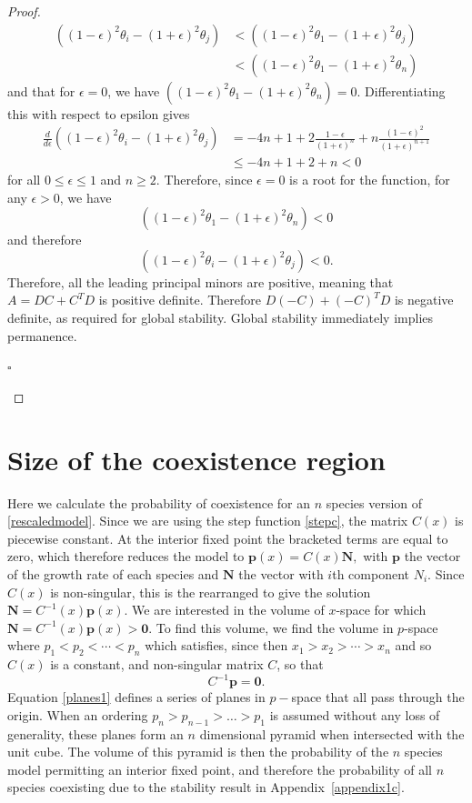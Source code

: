 \begin{proof}
\begin{align*}
\left( (1-\epsilon)^2\theta_i-(1+\epsilon)^2\theta_j\right)&<\left( (1-\epsilon)^2\theta_1-(1+\epsilon)^2\theta_j\right)\\
&<\left( (1-\epsilon)^2\theta_1-(1+\epsilon)^2\theta_n\right)
\end{align*}
and that for $\epsilon=0$, we have $\left( (1-\epsilon)^2\theta_1-(1+\epsilon)^2\theta_n\right)=0$. Differentiating this with respect to epsilon gives
\begin{align*}
\frac{d}{d\epsilon}\left( (1-\epsilon)^2\theta_i-(1+\epsilon)^2\theta_j\right)&=-4n+1+2\frac{1-\epsilon}{(1+\epsilon)^n}+n\frac{(1-\epsilon)^2}{(1+\epsilon)^{n+1}}\\
&\leq-4n +1+2+n < 0
\end{align*}
for all $0\leq \epsilon \leq 1$ and $n\geq2$. Therefore, since $\epsilon=0$ is a root for the function, for any $\epsilon>0$, we have
$$\left( (1-\epsilon)^2\theta_1-(1+\epsilon)^2\theta_n\right)<0$$
and therefore
$$\left( (1-\epsilon)^2\theta_i-(1+\epsilon)^2\theta_j\right)<0.$$
Therefore, all the leading principal minors are positive, meaning that $A=DC+C^TD$ is positive definite. Therefore $D(-C)+(-C)^TD$ is negative definite, as required for global stability. Global stability immediately implies permanence. \begin{flushright} $\square$ \end{flushright}
 \end{proof}
 
 \section{Size of the coexistence region}
 \label{appendix1d}
Here we calculate the probability of coexistence for an $n$ species version of \eqref{rescaledmodel}. Since we are using the step function \eqref{stepc}, the matrix $C(x)$ is piecewise constant. At the interior fixed point the bracketed terms are equal to zero, which therefore reduces the model to
$
\mathbf{p}(x)=C(x)\mathbf{N},
$
with $\mathbf{p}$ the vector of the growth rate of each species and $\mathbf{N}$ the vector with $i$th component $N_i$. Since $C(x)$ is non-singular, this is the rearranged to give the solution 
$
\mathbf{N}=C^{-1}(x)\textbf{p}(x)$. 
We are interested in the volume of $x$-space for which $\mathbf{N}=C^{-1}(x)\mathbf{p}(x)> \mathbf{0}$. To find this volume, we find the volume in $p$-space where $p_1 < p_2 <\cdots < p_n$ which satisfies, since then $x_1>x_2> \cdots > x_n$ and so $C(x)$ is a constant, and non-singular matrix $C$, so that
\begin{equation}
C^{-1}\mathbf{p} = \mathbf{0}. \label{planes1}
\end{equation}
Equation \eqref{planes1} defines a series of planes in $p-$space that all pass through the origin. When an ordering $p_n>p_{n-1}>\dots>p_1$ is assumed without any loss of generality, these planes form an $n$ dimensional pyramid when intersected with the unit cube. The volume of this pyramid is then the probability of the $n$ species model permitting an interior fixed point, and therefore the probability of all $n$ species coexisting due to the stability result in Appendix~\ref{appendix1c}.

